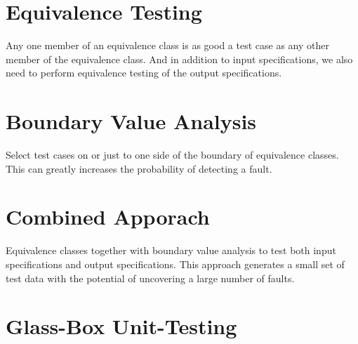\documentclass[11pt]{article}
\begin{document}
\section*{Equivalence Testing}

Any one member of an equivalence class is as good a test case as any other member of the equivalence class. And in addition to input specifications,  we also need to perform equivalence testing of the output specifications.


\section*{Boundary Value Analysis}

Select test cases on or just to one side of the boundary of equivalence classes. This can greatly increases the probability of detecting a fault.

\section*{Combined Apporach}

Equivalence classes together with boundary value analysis to test both input specifications and output specifications. This approach generates a small set of test data with the potential of uncovering a large number of faults.

\section*{Glass-Box Unit-Testing}
\end{document}
